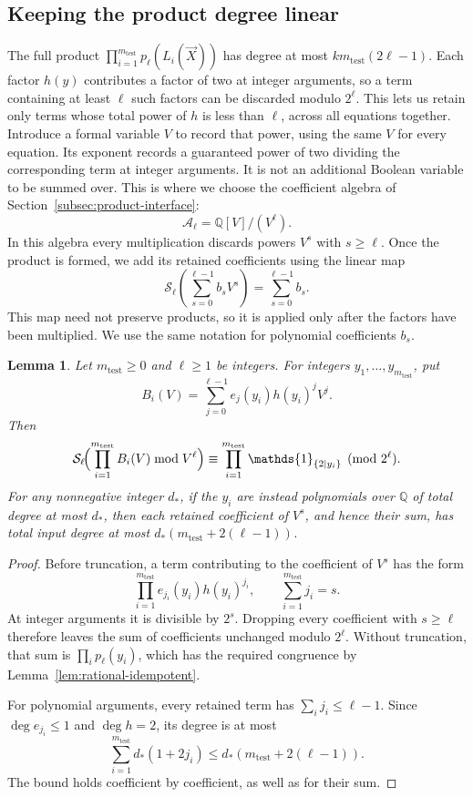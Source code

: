 \documentclass[11pt,reqno]{amsart}
\numberwithin{equation}{section}
\newtheorem{lemma}[theorem]{Lemma}
\theoremstyle{definition}\newtheorem{definition}[theorem]{Definition}
\theoremstyle{remark}\newtheorem{remark}[theorem]{Remark}
\renewcommand{\le}{\leqslant}
\renewcommand{\ge}{\geqslant}
\begin{document}
\subsection{Keeping the product degree linear}
The full product $\prod_{i=1}^{m_{\mathrm{test}}} p_\ell(L_i(\vec{X}))$ has degree at most
$km_{\mathrm{test}}(2\ell-1)$. Each factor $h(y)$ contributes a factor of two at
integer arguments, so a term containing at least $\ell$ such factors
can be discarded modulo $2^\ell$. This lets us retain only terms
whose total power of $h$ is less than $\ell$, across all equations together.
Introduce a formal variable $V$ to record that power, using the same
$V$ for every equation. Its exponent records a guaranteed power of two
dividing the corresponding term at integer arguments. It is not an
additional Boolean variable to be summed over.
This is where we choose the coefficient algebra of
Section~\ref{subsec:product-interface}:
\[
 \mathcal A_\ell=\mathbb Q[V]/(V^\ell).
\]
In this algebra every multiplication discards powers $V^s$ with
$s\ge\ell$. Once the product is formed, we add its retained
coefficients using the linear map
\[
 \mathcal S_\ell\!\left(\sum_{s=0}^{\ell-1}b_sV^s\right)
 =\sum_{s=0}^{\ell-1}b_s .
\]
This map need not preserve products, so it is applied only after the
factors have been multiplied. We use the same notation for polynomial
coefficients $b_s$.

\begin{lemma}\label{lem:total-order}
Let $m_{\mathrm{test}}\ge0$ and $\ell\ge1$ be integers. For integers
$y_1,\ldots,y_{m_{\mathrm{test}}}$, put
\[
 B_i(V)=\sum_{j=0}^{\ell-1}e_j(y_i)h(y_i)^jV^j.
\]
Then
\[
 \mathcal S_\ell\!\Bigl(\prod_{i=1}^{m_{\mathrm{test}}} B_i(V)\bmod V^\ell\Bigr)
 \equiv\prod_{i=1}^{m_{\mathrm{test}}}\mathds{1}_{\{2\mid y_i\}}\pmod{2^\ell}.
\]
For any nonnegative integer $d_*$, if the $y_i$ are instead
polynomials over $\mathbb Q$ of total degree at most $d_*$,
then each retained coefficient of $V^s$, and hence their sum, has
total input degree at most
$d_*(m_{\mathrm{test}}+2(\ell-1))$.
\end{lemma}
\begin{proof}
Before truncation, a term contributing to the coefficient of $V^s$
has the form
\[
 \prod_{i=1}^{m_{\mathrm{test}}} e_{j_i}(y_i)h(y_i)^{j_i},
 \qquad \sum_{i=1}^{m_{\mathrm{test}}} j_i=s.
\]
At integer arguments it is divisible by $2^s$. Dropping every
coefficient with $s\ge\ell$ therefore leaves the sum of coefficients
unchanged modulo $2^\ell$. Without truncation, that sum is
$\prod_i p_\ell(y_i)$, which has the required congruence by
Lemma~\ref{lem:rational-idempotent}.

For polynomial arguments, every retained term has
$\sum_i j_i\le\ell-1$. Since $\deg e_{j_i}\le1$ and $\deg h=2$,
its degree is at most
\[
 \sum_{i=1}^{m_{\mathrm{test}}} d_*(1+2j_i)
 \le d_*(m_{\mathrm{test}}+2(\ell-1)).
\]
The bound holds coefficient by coefficient, as well as for their sum.
\end{proof}
\end{document}
